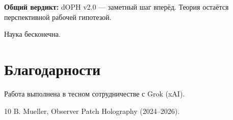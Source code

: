\documentclass[11pt,a4paper]{article}
\begin{document}
\textbf{Общий вердикт:}  
dOPH v2.0 — заметный шаг вперёд. Теория остаётся перспективной рабочей гипотезой.

Наука бесконечна.

\section*{Благодарности}

Работа выполнена в тесном сотрудничестве с Grok (xAI).

\begin{thebibliography}{10}
 B. Mueller, Observer Patch Holography (2024--2026).
\end{thebibliography}
\end{document}

